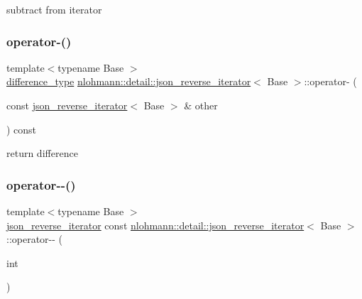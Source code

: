 subtract from iterator 

\mbox{\label{classnlohmann_1_1detail_1_1json__reverse__iterator_aaaa6c0b1d74e74e35e5f7b56dfd6c5d1}} 
\subsubsection{\texorpdfstring{operator-\/()}{operator-()}\hspace{0.1cm}{\footnotesize\ttfamily [2/2]}}
{\footnotesize\ttfamily template$<$typename Base $>$ \\
\hyperlink{classnlohmann_1_1detail_1_1json__reverse__iterator_a9ab55987c05ec6427ad36082e351cc45}{difference\+\_\+type} \hyperlink{classnlohmann_1_1detail_1_1json__reverse__iterator}{nlohmann\+::detail\+::json\+\_\+reverse\+\_\+iterator}$<$ Base $>$\+::operator-\/ (\begin{DoxyParamCaption}\item[{const \hyperlink{classnlohmann_1_1detail_1_1json__reverse__iterator}{json\+\_\+reverse\+\_\+iterator}$<$ Base $>$ \&}]{other }\end{DoxyParamCaption}) const\hspace{0.3cm}{\ttfamily [inline]}}



return difference 

\mbox{\label{classnlohmann_1_1detail_1_1json__reverse__iterator_a2c170f51371538da2c8f4094305da3d3}} 
\subsubsection{\texorpdfstring{operator-\/-\/()}{operator--()}\hspace{0.1cm}{\footnotesize\ttfamily [1/2]}}
{\footnotesize\ttfamily template$<$typename Base $>$ \\
\hyperlink{classnlohmann_1_1detail_1_1json__reverse__iterator}{json\+\_\+reverse\+\_\+iterator} const \hyperlink{classnlohmann_1_1detail_1_1json__reverse__iterator}{nlohmann\+::detail\+::json\+\_\+reverse\+\_\+iterator}$<$ Base $>$\+::operator-\/-\/ (\begin{DoxyParamCaption}\item[{int}]{ }\end{DoxyParamCaption})\hspace{0.3cm}{\ttfamily [inline]}}



